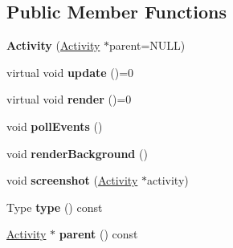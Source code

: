 \subsection*{Public Member Functions}
\begin{DoxyCompactItemize}
\item 
\hypertarget{classActivity_aa5ac7df38f7513ef37986a6252ac0a76}{{\bfseries Activity} (\hyperlink{classActivity}{Activity} $\ast$parent=N\-U\-L\-L)}\label{classActivity_aa5ac7df38f7513ef37986a6252ac0a76}

\item 
\hypertarget{classActivity_aac7476522336d91c0bf5cd4f547d5af7}{virtual void {\bfseries update} ()=0}\label{classActivity_aac7476522336d91c0bf5cd4f547d5af7}

\item 
\hypertarget{classActivity_a8f67a0273dba93784a56822de5aea3c4}{virtual void {\bfseries render} ()=0}\label{classActivity_a8f67a0273dba93784a56822de5aea3c4}

\item 
\hypertarget{classActivity_ab53334424e9f945a3fbcf4570626f847}{void {\bfseries poll\-Events} ()}\label{classActivity_ab53334424e9f945a3fbcf4570626f847}

\item 
\hypertarget{classActivity_a41158dea1149bf543e56a7690101369a}{void {\bfseries render\-Background} ()}\label{classActivity_a41158dea1149bf543e56a7690101369a}

\item 
\hypertarget{classActivity_a018ba1c18ef53dc9c090dae4f2b061af}{void {\bfseries screenshot} (\hyperlink{classActivity}{Activity} $\ast$activity)}\label{classActivity_a018ba1c18ef53dc9c090dae4f2b061af}

\item 
\hypertarget{classActivity_ab2157a3189dc2f765121e2578c6b2c16}{Type {\bfseries type} () const }\label{classActivity_ab2157a3189dc2f765121e2578c6b2c16}

\item 
\hypertarget{classActivity_a60e8fc6db09e906e9dc352c2de0bcccb}{\hyperlink{classActivity}{Activity} $\ast$ {\bfseries parent} () const }\label{classActivity_a60e8fc6db09e906e9dc352c2de0bcccb}

\end{DoxyCompactItemize}
